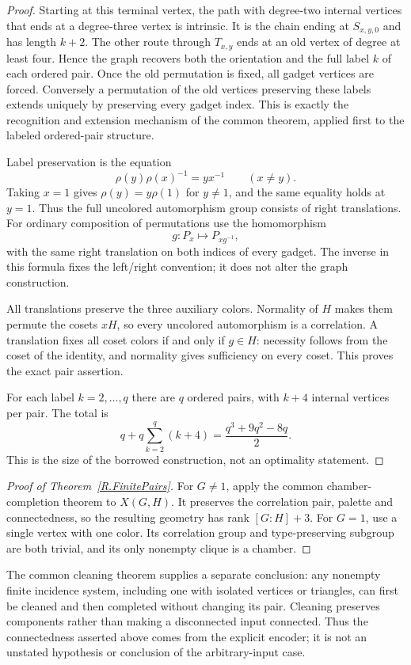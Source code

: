 \begin{proof}
Starting at this terminal vertex, the path with degree-two internal vertices
that ends at a degree-three vertex is intrinsic. It is the chain ending at
$S_{x,y,0}$ and has length $k+2$. The other route through $T_{x,y}$ ends at
an old vertex of degree at least four. Hence the graph recovers both the
orientation and the full label $k$ of each ordered pair. Once the old
permutation is fixed, all gadget vertices are forced. Conversely a permutation
of the old vertices preserving these labels extends uniquely by preserving
every gadget index. This is exactly the recognition and extension mechanism
of the common theorem, applied first to the labeled ordered-pair structure.

Label preservation is the equation
\[
 \rho(y)\rho(x)^{-1}=yx^{-1}\qquad(x\ne y).
\]
Taking $x=1$ gives $\rho(y)=y\rho(1)$ for $y\ne1$, and the same equality
holds at $y=1$. Thus the full uncolored automorphism group consists of right
translations. For ordinary composition of permutations use the homomorphism
\[
 g:P_x\longmapsto P_{xg^{-1}},
\]
with the same right translation on both indices of every gadget.
The inverse in this formula fixes the left/right convention; it does not
alter the graph construction.

All translations preserve the three auxiliary colors. Normality of $H$
makes them permute the cosets $xH$, so every uncolored automorphism is a
correlation. A translation fixes all coset colors if and only if $g\in H$:
necessity follows from the coset of the identity, and normality gives
sufficiency on every coset. This proves the exact pair assertion.

For each label $k=2,\ldots,q$ there are $q$ ordered pairs, with $k+4$
internal vertices per pair. The total is
\[
 q+q\sum_{k=2}^{q}(k+4)=\frac{q^3+9q^2-8q}{2}.
\]
This is the size of the borrowed construction, not an optimality statement.
\end{proof}

\begin{proof}[Proof of Theorem~\ref{R.FinitePairs}]
For $G\ne1$, apply the common chamber-completion theorem to
$X(G,H)$. It preserves the correlation pair, palette and connectedness,
so the resulting geometry has rank $[G:H]+3$. For $G=1$, use a single
vertex with one color. Its correlation group and type-preserving subgroup
are both trivial, and its only nonempty clique is a chamber.
\end{proof}

The common cleaning theorem supplies a separate conclusion: any nonempty
finite incidence system, including one with isolated vertices or triangles,
can first be cleaned and then completed without changing its pair. Cleaning
preserves components rather than making a disconnected input connected.
Thus the connectedness asserted above comes from the explicit encoder;
it is not an unstated hypothesis or conclusion of the arbitrary-input case.
